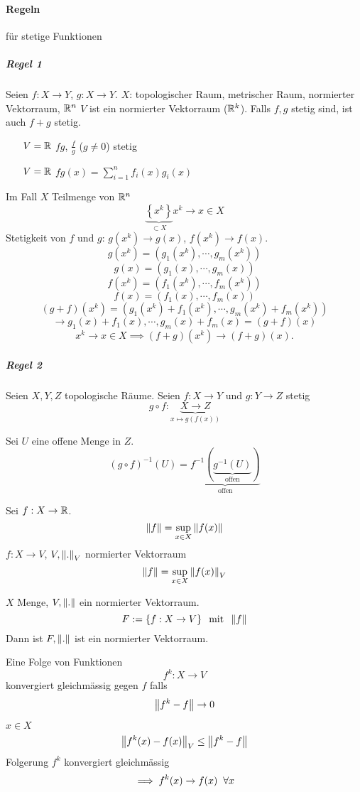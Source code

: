 \paragraph{Regeln} für stetige Funktionen
\subparagraph{Regel 1}
Seien $f:X\to Y$, $g:X\to Y$. $X$: topologischer Raum, metrischer Raum, normierter Vektorraum, $\mathbb{R}^n$ $V$ ist ein normierter Vektorraum ($\mathbb{R}^k$). Falls $f,g$ stetig sind, ist auch $f+g$ stetig. 
  \begin{itemize}
    \item[$V=\mathbb{R}$] $fg$, $\frac{f}{g}$ ($g\neq 0$) stetig
    \item[$V=\mathbb{R}$] $fg(x)=\sum_{i=1}^nf_i(x)g_i(x)$
  \end{itemize}
\begin{Bew}
  Im Fall $X$ Teilmenge von $\mathbb{R}^n$
  \[\underbrace{\left\{ x^k \right\}}_{\subset X} x^k\to x\in X\]
  Stetigkeit von $f$ und $g$: $g(x^k)\to g(x)$, $f(x^k)\to f(x)$.
  \[g(x^k)=(g_1(x^k),\cdots,g_m(x^k))\]
  \[g(x)=(g_1(x),\cdots,g_m(x))\]
  \[f(x^k)=(f_1(x^k),\cdots,f_m(x^k))\]
  \[f(x)=(f_1(x),\cdots,f_m(x))\]
  \[(g+f)(x^k)=\left( g_1(x^k)+f_1(x^k),\cdots,g_m(x^k)+f_m(x^k) \right)\]
  \[\to g_1(x)+f_1(x),\cdots,g_m(x)+f_m(x)=(g+f)(x)\]
  \[x^k\to x\in X\implies (f+g)(x^k)\to (f+g)(x).\]
\end{Bew}
\subparagraph{Regel 2}
Seien $X,Y,Z$ topologische Räume. Seien $f:X\to Y$ und $g:Y\to Z$ stetig
\[g\circ f:\underbrace{X\to Z}_{x\mapsto g(f(x))}\]
\begin{Bew}
  Sei $U$ eine offene Menge in $Z$.
  \[(g\circ f)^{-1}(U)=\underbrace{f^{-1}(\underbrace{g^{-1}(U)}_{\text{offen}})}_{\text{offen}}\]
\end{Bew}
\begin{Def}
  Sei $f:X\to \mathbb{R}$.
  \[\left\| f \right\|=\sup_{x\in X}\left\| f(x) \right\|\]
  $f:X\to V$, $V,\left\| . \right\|_V$ normierter Vektorraum
  \[\left\| f \right\|=\sup_{x\in X}\left\| f(x) \right\|_V\]
\end{Def}
\begin{Bem}
  $X$ Menge, $V,\left\| . \right\|$ ein normierter Vektorraum.
  \[F:=\left\{ f:X\to V\right\} \hspace{2mm}\text{mit}\hspace{2mm}\left\| f \right\|\]
  Dann ist $F,\left\| . \right\|$ ist ein normierter Vektorraum.
\end{Bem}
\begin{Def}
  Eine Folge von Funktionen
  \[f^k:X\to V\]
  konvergiert gleichmässig gegen $f$ falls
  \[\left\| f^k-f \right\|\to 0\]
\end{Def}
\begin{Bem}
  $x\in X$
  \[\left\| f^k(x)-f(x) \right\|_V\leq \left\| f^k-f \right\|\]
  Folgerung $f^k$ konvergiert gleichmässig
  \[\implies f^k(x)\to f(x)\hspace{2mm}\forall x\]
\end{Bem}
